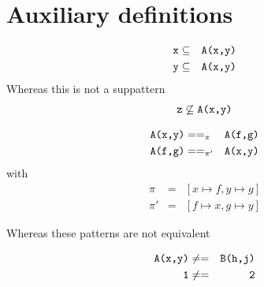 
\newcommand{\patexp}[2]{#1 \texttt{.} #2}
\newcommand{\fargs}[2]{#1 \texttt{ | } #2}
\newcommand{\cargs}[2]{#1 \texttt{,} #2}
\newcommand{\con}[2]{#1 \texttt{(} #2 \texttt{)}}
\newcommand{\fcall}[2]{#1 \texttt{(} #2 \texttt{)}}
\newcommand{\pipe}{\phantom{\ttt{fu}}\ttt{|}}








\section{Auxiliary definitions}

\begin{example}
  \label{ex:suppattern1}
  \begin{eqnarray*}
    \texttt{x} &\subseteq& \texttt{A(x,y)} \\
    \texttt{y} &\subseteq& \texttt{A(x,y)}
\end{eqnarray*}
Whereas this is not a suppattern
\begin{eqnarray*}
  \texttt{z} \not \subseteq \texttt{A(x,y)}
\end{eqnarray*}
\end{example}

\begin{example}[Pattern equivalence, $==_{\pi}$]
  \label{ex:pattern-equiv1}
  \begin{eqnarray*}
    \texttt{A(x,y)} &==_{\pi}& \texttt{A(f,g)}\\
    \texttt{A(f,g)} &==_{\pi'}& \texttt{A(x,y)}
  \end{eqnarray*}
with
  \begin{eqnarray*}
    \pi &=& [x\mapsto f, y \mapsto g] \\
    \pi' &=& [f \mapsto x, g \mapsto y]
\end{eqnarray*}

Whereas these patterns are not equivalent

  \begin{eqnarray*}
    \texttt{A(x,y)} &\not ==& \texttt{B(h,j)} \\
    \texttt{1} &\not ==& \texttt{2}
  \end{eqnarray*}
\end{example}

